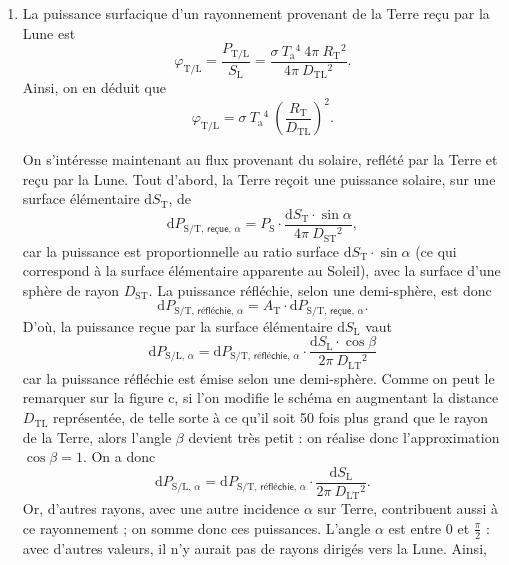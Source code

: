 \documentclass[a4paper, 11pt]{article}
\begin{document}
	\begin{multicols}{2}
		\begin{enumerate}[start=11]
			\item La puissance surfacique d'un rayonnement provenant de la Terre reçu par la Lune est \[
					\varphi_\mathrm{T/L} = \frac{P_\mathrm{T/L}}{S_\mathrm{L}} = \frac{\sigma\:T_\mathrm{a}{}^4\:4\pi\:R_\mathrm{T}{}^2}{4\pi\: D_\mathrm{TL}{}^2}
				.\] Ainsi, on en déduit que \[
					\boxed{\varphi_\mathrm{T/L} = \sigma\: T_\mathrm{a}{}^4 \: \left( \frac{R_\mathrm{T}}{D_\mathrm{TL}} \right)^{\!\!2}.}
				\]

				On s'intéresse maintenant au flux provenant du solaire, reflété par la Terre et reçu par la Lune.
				Tout d'abord, la Terre reçoit une puissance solaire, sur une surface élémentaire $\mathrm{d}S_\mathrm{T}$, de \[
					\mathrm{d}P_{\mathrm{S / T},\,\textsf{reçue},\,\alpha} = P_\mathrm{S} \cdot \frac{\mathrm{d}S_\mathrm{T} \cdot  \sin \alpha}{4\pi\:D_\mathrm{ST}{}^2},
				\] car la puissance est proportionnelle au ratio surface $\mathrm{d}S_\mathrm{T}\cdot \sin \alpha$ (ce qui correspond à la surface élémentaire apparente au Soleil), avec la surface d'une sphère de rayon $D_\mathrm{ST}$.
				La puissance réfléchie, selon une demi-sphère, est donc \[
					\mathrm{d}P_{\mathrm{S / T},\,\textsf{réfléchie},\,\alpha} = A_\mathrm{T} \cdot \mathrm{d}P_{\mathrm{S / T},\,\textsf{reçue},\,\alpha}
				.\]
				D'où, la puissance reçue par la surface élémentaire $\mathrm{d}S_\mathrm{L}$\/ vaut \[
					\mathrm{d}P_{\mathrm{S / L},\,\alpha} = \mathrm{d}P_{\mathrm{S/T},\,\textsf{réfléchie},\,\alpha} \cdot \frac{\mathrm{d}S_\mathrm{L} \cdot \cos \beta}{2 \pi\: D_\mathrm{LT}{}^2}
				\] car la puissance réfléchie est émise selon une demi-sphère.
				Comme on peut le remarquer sur la figure c, si l'on modifie le schéma en augmentant la distance $D_\mathrm{TL}$\/ représentée, de telle sorte à ce qu'il soit 50 fois plus grand que le rayon de la Terre, alors l'angle $\beta$\/ devient très petit : on réalise donc l'approximation $\cos \beta = 1$. On a donc \[
					\mathrm{d}P_{\mathrm{S / L},\, \alpha} = \mathrm{d}P_{\mathrm{S / T},\,\textsf{réfléchie},\,\alpha} \cdot \frac{\mathrm{d}S_\mathrm{L}}{2\pi\:D_\mathrm{LT}{}^2}
				.\] 
				Or, d'autres rayons, avec une autre incidence $\alpha$\/ sur Terre, contribuent aussi à ce rayonnement ; on somme donc ces puissances.
				L'angle $\alpha$\/ est entre $0$\/ et $\frac{\pi}{2}$ : avec d'autres valeurs, il n'y aurait pas de rayons dirigés vers la Lune.
				Ainsi,
				\begin{align*}

\end{align*}
\end{enumerate}
\end{multicols}
\end{document}
